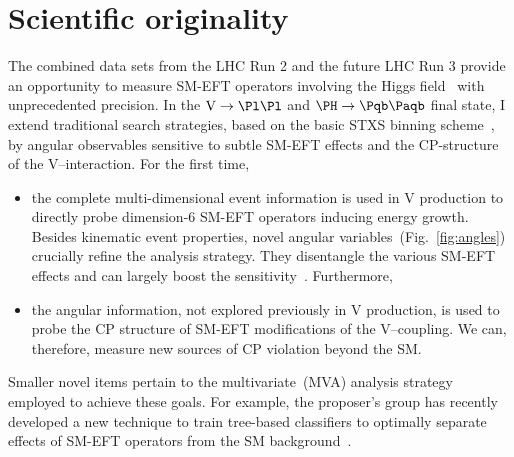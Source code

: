 \documentclass[a4paper,11pt]{article}
\newcommand{\Pb}{{{\Pqb}}\xspace}
\newcommand{\PAb}{{{{\Paqb}}}\xspace}
\renewcommand{\PV}{{{{V}}}\xspace}
\newcommand{\VH}{{{\PV}{\PH}}\xspace}
\begin{document}
\section{Scientific originality}

The combined data sets from the LHC Run 2 and the future LHC Run 3 provide an opportunity to measure SM-EFT operators involving the Higgs field~\cite{Elias-Miro:2013mua,Gupta:2014rxa} with unprecedented precision. 
In the $\textrm{\PV}\rightarrow\Pl\Pl$ and $\PH\rightarrow\Pb\PAb$ final state, I extend traditional search strategies, based on the basic STXS binning scheme~\cite{Berger:2019wnu}, by angular observables sensitive to subtle SM-EFT effects and the CP-structure of the \PV--\PH interaction. For the first time,



\begin{itemize}

\item the complete multi-dimensional event information is used in \VH production to directly probe dimension-6 SM-EFT operators inducing energy growth.
Besides kinematic event properties, novel angular variables~(Fig.~\ref{fig:angles}) crucially refine the analysis strategy. 
They disentangle the various SM-EFT effects and can largely boost the sensitivity~\cite{CMS-PAS-SMP-20-005}. Furthermore, %

\item the angular information, not explored previously in \VH production, is used to probe the CP structure of SM-EFT modifications of the \PV--\PH coupling. We can, therefore, measure new sources of CP violation beyond the SM.
\end{itemize}

Smaller novel items pertain to the multivariate~(MVA) analysis strategy employed to achieve these goals. 
For example, the proposer's group has recently developed a new technique to train tree-based classifiers to optimally separate effects of SM-EFT operators from the SM background~\cite{Chatterjee:2021nms}.
\end{document}
